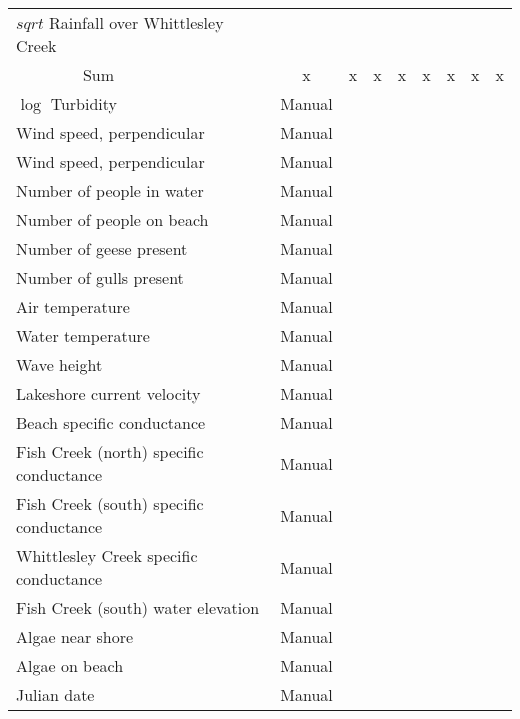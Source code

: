 \documentclass[12pt]{article}
\begin{document}
\begin{table}
{\begin{minipage}{\textwidth}
\begin{tabular}{ll|cccccccc}
        \multicolumn{2}{l|}{$sqrt$ Rainfall over Whittlesley Creek} &&&&&&&& \\
        & Sum & x & x & x & x & x & x & x & x \\
        \hline
        \multicolumn{2}{l|}{$\log$ Turbidity} & Manual&&&&&&& \\
        \hline
        \multicolumn{2}{l|}{Wind speed, perpendicular} & Manual&&&&&&& \\
        \hline
        \multicolumn{2}{l|}{Wind speed, perpendicular} & Manual&&&&&&& \\
        \hline
        \multicolumn{2}{l|}{Number of people in water} & Manual&&&&&&& \\
        \hline
        \multicolumn{2}{l|}{Number of people on beach} & Manual&&&&&&& \\
        \hline
        \multicolumn{2}{l|}{Number of geese present} & Manual&&&&&&& \\
        \hline
        \multicolumn{2}{l|}{Number of gulls present} & Manual&&&&&&& \\
        \hline
        \multicolumn{2}{l|}{Air temperature} & Manual&&&&&&& \\
        \hline
        \multicolumn{2}{l|}{Water temperature} & Manual&&&&&&& \\
        \hline
        \multicolumn{2}{l|}{Wave height} & Manual&&&&&&& \\
        \hline
        \multicolumn{2}{l|}{Lakeshore current velocity} & Manual&&&&&&& \\
        \hline
        \multicolumn{2}{l|}{Beach specific conductance} & Manual&&&&&&& \\
        \hline
        \multicolumn{2}{l|}{Fish Creek (north) specific conductance} & Manual&&&&&&& \\
        \hline
        \multicolumn{2}{l|}{Fish Creek (south) specific conductance} & Manual&&&&&&& \\
        \hline
        \multicolumn{2}{l|}{Whittlesley Creek specific conductance} & Manual&&&&&&& \\
        \hline
        \multicolumn{2}{l|}{Fish Creek (south) water elevation} & Manual&&&&&&& \\
        \hline
        \multicolumn{2}{l|}{Algae near shore} & Manual&&&&&&& \\
        \hline
        \multicolumn{2}{l|}{Algae on beach} & Manual&&&&&&& \\
        \hline
        \multicolumn{2}{l|}{Julian date} & Manual&&&&&&& \\
        \hline
        \end{tabular}
        \end{minipage}}
\end{table}
\end{document}
